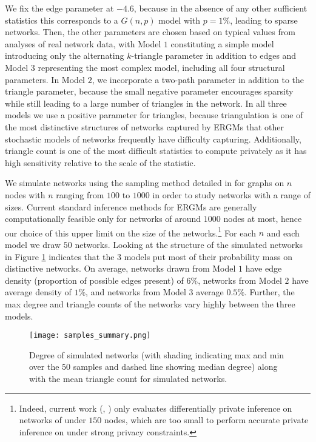  	 We fix the edge parameter at $-4.6$, because in the absence of any other sufficient statistics this corresponds to a $G(n,p)$ model with $p = 1\%$, leading to sparse networks. Then, the other parameters are chosen based on typical values from analyses of real network data, with Model $1$ constituting a simple model introducing only the alternating $k$-triangle parameter in addition to edges and Model $3$ representing the most complex model, including all four structural parameters. In Model $2$, we incorporate a two-path parameter in addition to the triangle parameter, because the small negative parameter encourages sparsity while still leading to a large number of triangles in the network. In all three models we use a positive parameter for triangles, because triangulation is one of the most distinctive structures of networks captured by ERGMs that other stochastic models of networks frequently have difficulty capturing. Additionally, triangle count is one of the most difficult statistics to compute privately as it has high sensitivity relative to the scale of the statistic. 
 	 
 	We simulate networks using the sampling method detailed in  for graphs on $n$ nodes with $n$ ranging from $100$ to $1000$ in order to study networks with a range of sizes. Current standard inference methods for ERGMs are generally computationally feasible only for networks of around $1000$ nodes at most, hence our choice of this upper limit on the size of the networks.\footnote{Indeed, current work (\cite{LM14}, \cite{KKS17}) only evaluates differentially private inference on networks of under $150$ nodes, which are too small to perform accurate private inference on under strong privacy constraints.} For each $n$ and each model we draw $50$ networks. Looking at the structure of the simulated networks in Figure \ref{fig:priv_structure} indicates that the $3$ models put most of their probability mass on distinctive networks. On average, networks drawn from Model $1$  have edge density (proportion of possible edges present) of $6\%$, networks from Model $2$ have average density of $1\%$, and networks from Model $3$ average $0.5\%$.  Further, the max degree and triangle counts of the networks vary highly between the three models.
 	
 	\begin{figure}[!h]
 		\centering
 		\texttt{[image: samples\_summary.png]}
 		\caption{Degree of simulated networks (with shading indicating max and min over the $50$ samples and dashed line showing median degree) along with the mean triangle count for simulated networks.}
 		\label{fig:priv_structure}
 	\end{figure}
 
